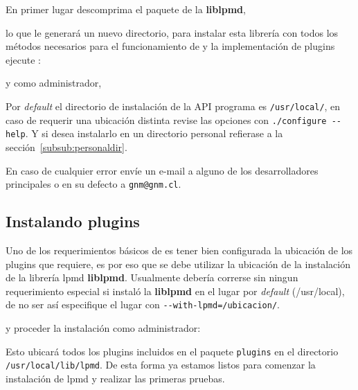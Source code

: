 En primer lugar descomprima el paquete de la \textbf{liblpmd},


lo que le generar\'a un nuevo directorio, para instalar esta librer\'ia con todos los m\'etodos necesarios para el funcionamiento de \lpmd y la implementaci\'on de plugins ejecute :


y como administrador,




Por \textit{default} el directorio de instalaci\'on de la API programa es \verb|/usr/local/|, en caso de requerir una ubicaci\'on distinta revise las opciones con \verb|./configure --help|. Y si desea instalarlo en un directorio personal refierase a la secci\'on~\ref{subsub:personaldir}.

En caso de cualquier error env\'ie un e-mail a alguno de los desarrolladores principales o en su defecto a \verb|gnm@gnm.cl|.

\subsection{Instalando plugins}

Uno de los requerimientos b\'asicos de \lpmd es tener bien configurada la ubicaci\'on de los plugins que \lpmd requiere, es por eso que se debe utilizar la ubicaci\'on de la instalaci\'on de la librer\'ia lpmd \textbf{liblpmd}. Usualmente deber\'ia correrse sin ningun requerimiento especial si instal\'o la \textbf{liblpmd} en el lugar por \textit{default} (/usr/local), de no ser as\'i especifique el lugar con \verb|--with-lpmd=/ubicacion/|.


y proceder la instalaci\'on como administrador:


Esto ubicar\'a todos los plugins incluidos en el paquete \verb|plugins| en el directorio \verb|/usr/local/lib/lpmd|. De esta forma ya estamos listos para comenzar la instalaci\'on de lpmd y realizar las primeras pruebas.

